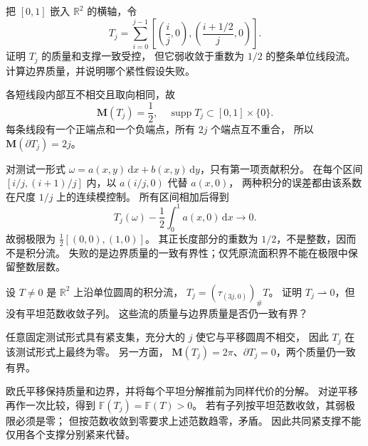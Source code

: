 \begin{exercise}\label{b1:ex:app-d-unbounded-boundary}
把 \([0,1]\) 嵌入 \(\mathbb R^2\) 的横轴，令
\[
 T_j=\sum_{i=0}^{j-1}
       \left[\left(\frac{i}{j},0\right),
             \left(\frac{i+1/2}{j},0\right)\right].
\]
证明 \(T_j\) 的质量和支撑一致受控，
但它弱收敛于重数为 \(1/2\) 的整条单位线段流。
计算边界质量，并说明哪个紧性假设失败。
\end{exercise}
\begin{solution}
各短线段内部互不相交且取向相同，故
\[
 \mathbf M(T_j)=\frac12,\quad
 \operatorname{supp}T_j\subset[0,1]\times\{0\}.
\]
每条线段有一个正端点和一个负端点，所有 \(2j\) 个端点互不重合，
所以 \(\mathbf M(\partial T_j)=2j\)。

对测试一形式 \(\omega=a(x,y)\,\mathrm{d}x+b(x,y)\,\mathrm{d}y\)，只有第一项贡献积分。
在每个区间 \([i/j,(i+1)/j]\) 内，以 \(a(i/j,0)\) 代替 \(a(x,0)\)，
两种积分的误差都由该系数在尺度 \(1/j\) 上的连续模控制。
所有区间相加后得到
\[
 T_j(\omega)-\frac12\int_0^1a(x,0)\,\mathrm{d}x\longrightarrow0.
\]
故弱极限为 \(\frac12[(0,0),(1,0)]\)。
其正长度部分的重数为 \(1/2\)，不是整数，因而不是积分流。
失败的是边界质量的一致有界性；仅凭原流面积界不能在极限中保留整数层数。
\end{solution}

\begin{exercise}\label{b1:ex:app-d-escape-to-infinity}
设 \(T\neq0\) 是 \(\mathbb R^2\) 上沿单位圆周的积分流，
\(T_j=(\tau_{(3j,0)})_\#T\)。
证明 \(T_j\rightharpoonup0\)，但没有平坦范数收敛子列。
这些流的质量与边界质量是否仍一致有界？
\end{exercise}
\begin{solution}
任意固定测试形式具有紧支集，充分大的 \(j\) 使它与平移圆周不相交，
因此 \(T_j\) 在该测试形式上最终为零。
另一方面，
\(\mathbf M(T_j)=2\pi\)、\(\partial T_j=0\)，两个质量仍一致有界。

欧氏平移保持质量和边界，并将每个平坦分解推前为同样代价的分解。
对逆平移再作一次比较，得到
\(\mathbb F(T_j)=\mathbb F(T)>0\)。
若有子列按平坦范数收敛，其弱极限必须是零；
但按范数收敛到零要求上述范数趋零，矛盾。
因此共同紧支撑不能仅用各个支撑分别紧来代替。
\end{solution}

